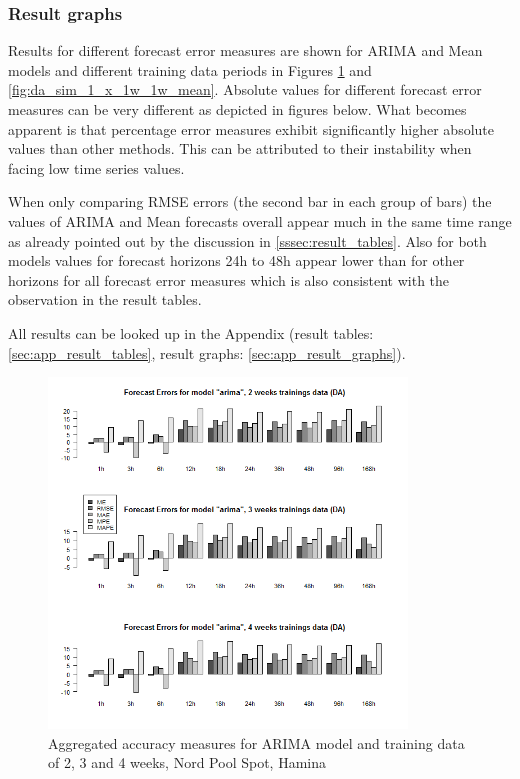 \subsubsection{Result graphs}

Results for different forecast error measures are shown for ARIMA and Mean models and different training data periods in Figures \ref{fig:da_sim_1_x_1w_1w_arima} and \ref{fig:da_sim_1_x_1w_1w_mean}. Absolute values for different forecast error measures can be very different as depicted in figures below. What becomes apparent is that percentage error measures exhibit significantly higher absolute values than other methods. This can be attributed to their instability when facing low time series values. 

When only comparing RMSE errors (the second bar in each group of bars) the values of ARIMA and Mean forecasts overall appear much in the same time range as already pointed out by the discussion in \ref{sssec:result_tables}. Also for both models values for forecast horizons 24h to 48h appear lower than for other horizons for all forecast error measures which is also consistent with the observation in the result tables. 

All results can be looked up in the Appendix (result tables: \ref{sec:app_result_tables}, result graphs: \ref{sec:app_result_graphs}). 

\begin{figure}[htbp]
	\centering
		\includegraphics[width=0.85\textwidth]{figures/forecasting/da_sim_1_x_1w_1w_arima.png}
	\caption{Aggregated accuracy measures for ARIMA model and training data of 2, 3 and 4 weeks, Nord Pool Spot, Hamina}
	\label{fig:da_sim_1_x_1w_1w_arima}
\end{figure}

